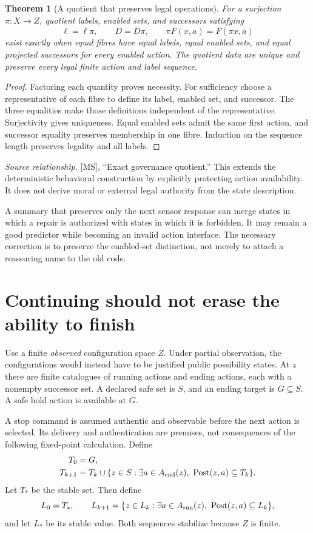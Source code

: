 \documentclass[11pt,oneside,openany]{book}
\newtheorem{theorem}{Theorem}[chapter]
\theoremstyle{definition}\newtheorem{definition}[theorem]{Definition}
\newcommand{\source}[1]{\par{\small\textit{Source relationship.} #1}\par}
\begin{document}
\begin{theorem}[A quotient that preserves legal operations]\label{r:governance}
For a surjection $\pi:X\to Z$, quotient labels, enabled sets, and successors satisfying
\[
\ell=\bar\ell\pi,\qquad D=\bar D\pi,\qquad
\pi F(x,a)=\bar F(\pi x,a)
\]
exist exactly when equal fibres have equal labels, equal enabled sets, and equal projected successors for every enabled action. The quotient data are unique and preserve every legal finite action and label sequence.
\end{theorem}
\begin{proof}
Factoring each quantity proves necessity. For sufficiency choose a representative of each fibre to define its label, enabled set, and successor. The three equalities make those definitions independent of the representative. Surjectivity gives uniqueness. Equal enabled sets admit the same first action, and successor equality preserves membership in one fibre. Induction on the sequence length preserves legality and all labels.
\end{proof}
\source{[MS], ``Exact governance quotient.'' This extends the deterministic behavioral construction by explicitly protecting action availability. It does not derive moral or external legal authority from the state description.}

A summary that preserves only the next sensor response can merge states in which a repair is authorized with states in which it is forbidden. It may remain a good predictor while becoming an invalid action interface. The necessary correction is to preserve the enabled-set distinction, not merely to attach a reassuring name to the old code.

\section{Continuing should not erase the ability to finish}
Use a finite \emph{observed} configuration space $Z$. Under partial observation, the configurations would instead have to be justified public possibility states. At $z$ there are finite catalogues of running actions and ending actions, each with a nonempty successor set. A declared safe set is $S$, and an ending target is $G\subseteq S$. A safe hold action is available at $G$.

A stop command is assumed authentic and observable before the next action is selected. Its delivery and authentication are premises, not consequences of the following fixed-point calculation. Define
\begin{align*}
T_0&=G,\\
T_{k+1}&=T_k\cup\{z\in S:\exists a\in A_{\rm end}(z),\ \operatorname{Post}(z,a)\subseteq T_k\}.
\end{align*}
Let $T_*$ be the stable set. Then define
\[
L_0=T_*,\qquad
L_{k+1}=\{z\in L_k:\exists a\in A_{\rm run}(z),\ \operatorname{Post}(z,a)\subseteq L_k\},
\]
and let $L_*$ be its stable value. Both sequences stabilize because $Z$ is finite.
\end{document}
